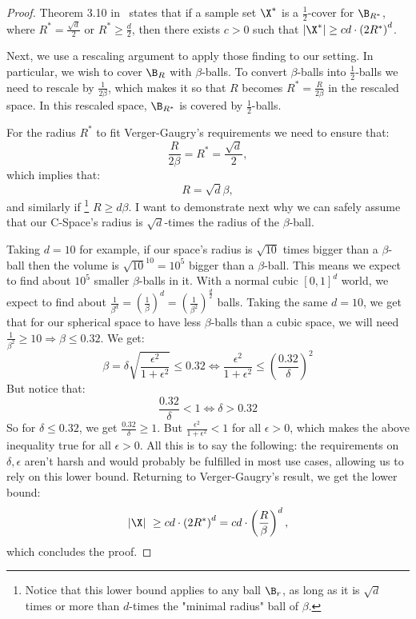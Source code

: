 \begin{proof}
Theorem 3.10 in~\cite{verger2005covering} states that if a sample set $\X^*$ is a $\frac{1}{2}$-cover for $\B_{R^*}$, where $R^*=\frac{\sqrt{d}}{2}$ or $R^*\geq\frac{d}{2}$, then there exists $c>0$ such that $|\X^*|\geq cd\cdot \left(2R^*\right)^d$.


Next, we use a rescaling argument to apply those finding to our setting. In particular, we wish to cover $\B_R$ with $\beta$-balls. To convert $\beta$-balls into $\frac{1}{2}$-balls we need to rescale by $\frac{1}{2\beta}$, which makes it so that $R$ becomes $R^*=\frac{R}{2\beta}$ in the rescaled space. In this rescaled space, $\B_{R^*}$ is covered by $\frac{1}{2}$-balls. 


For the radius $R^*$ to fit Verger-Gaugry's requirements we need to ensure  that:
\begin{equation*}
    \frac{R}{2\beta} = R^* = \frac{\sqrt{d}}{2},
\end{equation*}
which implies that:
\[
    R=\sqrt{d}\beta,
\]
and similarly if \footnote{Notice that this lower bound applies to any ball $\B_r$, as long as it is $\sqrt{d}$ times or more than $d$-times the "minimal radius" ball of $\beta$.} $R\geq d\beta$. I want to demonstrate next why we can safely assume that our C-Space's radius is $\sqrt{d}$-times the radius of the $\beta$-ball. 


Taking $d=10$ for example, if our space's radius is $\sqrt{10}$ times bigger than a $\beta$-ball then the volume is $\sqrt{10}^{10}=10^5$ bigger than a $\beta$-ball. This means we expect to find about $10^5$ smaller $\beta$-balls in it. With a normal cubic $[0,1]^d$ world, we expect to find about $\frac{1}{\beta^d}=\left(\frac{1}{\beta}\right)^d=\left(\frac{1}{\beta^2}\right)^{\frac{d}{2}}$ balls. Taking the same $d=10$, we get that for our spherical space to have less $\beta$-balls than a cubic space, we will need $\frac{1}{\beta^2}\geq 10 \Rightarrow \beta \leq 0.32$. We get:
\[
    \beta=\delta\sqrt{\frac{\epsilon^2}{1+\epsilon^2}}\leq0.32 \iff \frac{\epsilon^2}{1+\epsilon^2}\leq \left(\frac{0.32}{\delta}\right)^2
\]
But notice that:
\[
    \frac{0.32}{\delta}<1 \iff \delta>0.32
\]
So for $\delta\leq 0.32$, we get $\frac{0.32}{\delta}\geq1$. But $\frac{\epsilon^2}{1+\epsilon^2}<1$ for all $\epsilon>0$, which makes the above inequality true for all $\epsilon>0$. All this is to say the following: the requirements on $\delta,\epsilon$ aren't harsh and would probably be fulfilled in most use cases, allowing us to rely on this lower bound. Returning to Verger-Gaugry's result, we get the lower bound:
\begin{equation*}
    |\X|\ \geq cd\cdot \left(2R^*\right)^d = cd\cdot \left(\frac{R}{\beta}\right)^d,
\end{equation*}
which concludes the proof. \qedsymbol
\end{proof}


